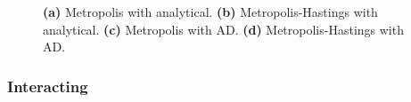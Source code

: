 \begin{figure}[!htb]
\qquad
{}
\caption{\textbf{(a)} Metropolis with analytical. \textbf{(b)} Metropolis-Hastings with analytical. \textbf{(c)} Metropolis with AD. \textbf{(d)} Metropolis-Hastings with AD.}
\label{fig:non-interact_boxplot}
\end{figure}

\subsubsection{Interacting}
